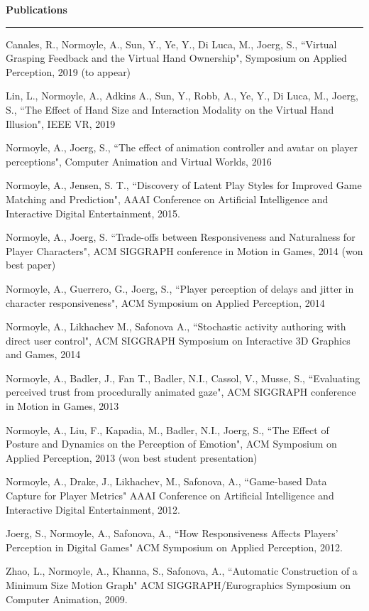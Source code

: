 {\Large {\bf  Publications}}
\vspace{0.1cm}
\hrule
\medskip

Canales, R., Normoyle, A., Sun, Y., Ye, Y., Di Luca, M., Joerg, S., ``Virtual Grasping Feedback and the Virtual Hand Ownership", Symposium on Applied Perception, 2019 (to appear)

Lin, L., Normoyle, A., Adkins A., Sun, Y., Robb, A., Ye, Y., Di Luca, M., Joerg, S., ``The Effect of Hand Size and Interaction Modality on the Virtual Hand Illusion", IEEE VR, 2019

Normoyle, A., Joerg, S., ``The effect of animation controller and avatar on player perceptions", 
Computer Animation and Virtual Worlds, 2016 

Normoyle, A., Jensen, S. T., ``Discovery of Latent Play Styles for Improved Game Matching and Prediction", 
AAAI Conference on Artificial Intelligence and Interactive Digital Entertainment, 2015.

Normoyle, A., Joerg, S. ``Trade-offs between Responsiveness and Naturalness for Player Characters", 
ACM SIGGRAPH conference in Motion in Games, 2014 (won best paper)

Normoyle, A., Guerrero, G., Joerg, S., ``Player perception of delays and jitter in character responsiveness", 
ACM Symposium on Applied Perception, 2014 

Normoyle, A., Likhachev M., Safonova A., ``Stochastic activity authoring with direct user control", 
ACM SIGGRAPH Symposium on Interactive 3D Graphics and Games, 2014 

Normoyle, A., Badler, J., Fan T., Badler, N.I., Cassol, V., Musse, S., ``Evaluating perceived trust from procedurally animated gaze", ACM SIGGRAPH conference in Motion in Games, 2013 

Normoyle, A., Liu, F., Kapadia, M., Badler, N.I., Joerg, S., ``The Effect of Posture and Dynamics on the Perception of Emotion", ACM Symposium on Applied Perception, 2013 (won best student presentation)

Normoyle, A., Drake, J., Likhachev, M., Safonova, A., ``Game-based Data Capture for Player Metrics" 
AAAI Conference on Artificial Intelligence and Interactive Digital Entertainment, 2012.

Joerg, S., Normoyle, A., Safonova, A., ``How Responsiveness Affects Players' Perception in Digital Games" 
ACM Symposium on Applied Perception, 2012.

Zhao, L., Normoyle, A., Khanna, S., Safonova, A., ``Automatic Construction of a Minimum Size Motion Graph" ACM SIGGRAPH/Eurographics Symposium on Computer Animation, 2009.

